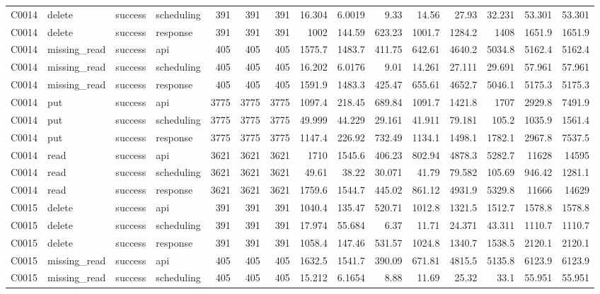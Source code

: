 \begin{landscape}
\begin{longtable}{llllrrrrrrrrrrr}
C0014 & delete & success & scheduling & 391 & 391 & 391 & 16.304 & 6.0019 & 9.33 & 14.56 & 27.93 & 32.231 & 53.301 & 53.301\\
C0014 & delete & success & response & 391 & 391 & 391 & 1002 & 144.59 & 623.23 & 1001.7 & 1284.2 & 1408 & 1651.9 & 1651.9\\
C0014 & missing\_\allowbreak{}read & success & api & 405 & 405 & 405 & 1575.7 & 1483.7 & 411.75 & 642.61 & 4640.2 & 5034.8 & 5162.4 & 5162.4\\
C0014 & missing\_\allowbreak{}read & success & scheduling & 405 & 405 & 405 & 16.202 & 6.0176 & 9.01 & 14.261 & 27.111 & 29.691 & 57.961 & 57.961\\
C0014 & missing\_\allowbreak{}read & success & response & 405 & 405 & 405 & 1591.9 & 1483.3 & 425.47 & 655.61 & 4652.7 & 5046.1 & 5175.3 & 5175.3\\
C0014 & put & success & api & 3775 & 3775 & 3775 & 1097.4 & 218.45 & 689.84 & 1091.7 & 1421.8 & 1707 & 2929.8 & 7491.9\\
C0014 & put & success & scheduling & 3775 & 3775 & 3775 & 49.999 & 44.229 & 29.161 & 41.911 & 79.181 & 105.2 & 1035.9 & 1561.4\\
C0014 & put & success & response & 3775 & 3775 & 3775 & 1147.4 & 226.92 & 732.49 & 1134.1 & 1498.1 & 1782.1 & 2967.8 & 7537.5\\
C0014 & read & success & api & 3621 & 3621 & 3621 & 1710 & 1545.6 & 406.23 & 802.94 & 4878.3 & 5282.7 & 11628 & 14595\\
C0014 & read & success & scheduling & 3621 & 3621 & 3621 & 49.61 & 38.22 & 30.071 & 41.79 & 79.582 & 105.69 & 946.42 & 1281.1\\
C0014 & read & success & response & 3621 & 3621 & 3621 & 1759.6 & 1544.7 & 445.02 & 861.12 & 4931.9 & 5329.8 & 11666 & 14629\\
C0015 & delete & success & api & 391 & 391 & 391 & 1040.4 & 135.47 & 520.71 & 1012.8 & 1321.5 & 1512.7 & 1578.8 & 1578.8\\
C0015 & delete & success & scheduling & 391 & 391 & 391 & 17.974 & 55.684 & 6.37 & 11.71 & 24.371 & 43.311 & 1110.7 & 1110.7\\
C0015 & delete & success & response & 391 & 391 & 391 & 1058.4 & 147.46 & 531.57 & 1024.8 & 1340.7 & 1538.5 & 2120.1 & 2120.1\\
C0015 & missing\_\allowbreak{}read & success & api & 405 & 405 & 405 & 1632.5 & 1541.7 & 390.09 & 671.81 & 4815.5 & 5135.8 & 6123.9 & 6123.9\\
C0015 & missing\_\allowbreak{}read & success & scheduling & 405 & 405 & 405 & 15.212 & 6.1654 & 8.88 & 11.69 & 25.32 & 33.1 & 55.951 & 55.951\\

\end{longtable}
\end{landscape}
